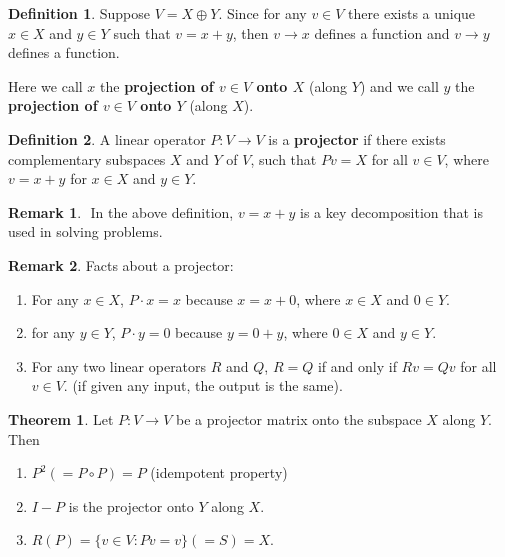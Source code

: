 \documentclass[12pt]{article}
\theoremstyle{definition}
\newtheorem*{definition}{Definition}
\newtheorem{theorem}{Theorem}[section]  %
\newtheorem*{remark}{Remark}
\begin{document}
\begin{definition}
\noindent Suppose $V = X \oplus Y$. Since for any $v \in V$ there exists a unique $x \in X$ and $y \in Y$
such that $v = x + y$, then $v \rightarrow x$ defines a function and $v \rightarrow y$ defines a
function.

Here we call $x$ the \textbf{projection of $v \in V$ onto $X$} (along $Y$) and we call $y$ the
\textbf{projection of $v \in V$ onto $Y$} (along $X$). 
\end{definition}

\begin{definition}
A linear operator $P : V \rightarrow V$ is a \textbf{projector} if there exists complementary
subspaces $X$ and $Y$ of $V$, such that $Pv = X$ for all $v \in V$, where $v = x + y$ for
$x \in X$ and $y \in Y$.
\end{definition}

\begin{remark} $ $
In the above definition, $v = x + y$ is a key decomposition that is used in solving problems.
\end{remark}

\begin{remark} Facts about a projector:

\begin{enumerate}[label = (\arabic*)]
\item For any $x \in X$, $P \cdot x = x$ because $x = x + 0$, where $x \in X$ and $0 \in Y$.
\item for any $y \in Y$, $P \cdot y = 0$ because $y = 0 + y$, where $0 \in X$ and $y \in Y$.
\item For any two linear operators $R$ and $Q$, $R = Q$ if and only if $Rv = Qv$ for all
$v \in V$. (if given any input, the output is the same).
\end{enumerate}
\end{remark}

\begin{theorem}
Let $P: V \rightarrow V$ be a projector matrix onto the subspace $X$ along $Y$. Then

\begin{enumerate}[label = (\arabic*)]
\item $P^2 (= P \circ P) = P$ (idempotent property)
\item $I - P$ is the projector onto $Y$ along $X$.
\item $R(P) = \{v \in V : Pv = v \} (=S) = X$.
\end{enumerate}
\end{theorem}
\end{document}
